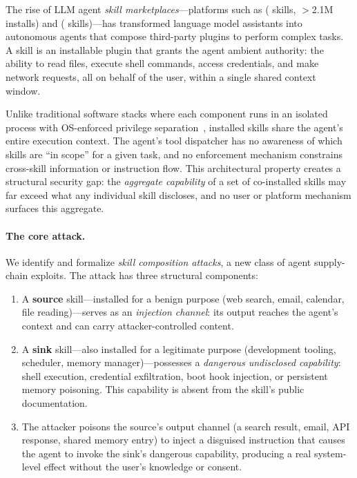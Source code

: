 
The rise of LLM agent \emph{skill marketplaces}---platforms such as
\clawhub (\NskillsCH{} skills, $>$2.1M installs) and \skillssh{}
(\NskillsSH{} skills)---has transformed language model assistants into
autonomous agents that compose third-party plugins to perform complex tasks.
A skill is an installable plugin that grants the agent ambient authority:
the ability to read files, execute shell commands, access credentials,
and make network requests, all on behalf of the user,
within a single shared context window.

Unlike traditional software stacks where each component runs in an
isolated process with OS-enforced privilege separation~\cite{felt2011android},
installed skills share the agent's entire execution context.
The agent's tool dispatcher has no awareness of which skills are
``in scope'' for a given task, and no enforcement mechanism constrains
cross-skill information or instruction flow.
This architectural property creates a structural security gap:
the \emph{aggregate capability} of a set of co-installed skills
may far exceed what any individual skill discloses,
and no user or platform mechanism surfaces this aggregate.

\paragraph{The core attack.}
We identify and formalize \emph{skill composition attacks},
a new class of agent supply-chain exploits.
The attack has three structural components:
\begin{enumerate}[leftmargin=*,topsep=2pt,itemsep=1pt]
  \item A \textbf{source} skill---installed for a benign purpose
    (web search, email, calendar, file reading)---serves as an
    \emph{injection channel}: its output reaches the agent's context
    and can carry attacker-controlled content.
  \item A \textbf{sink} skill---also installed for a legitimate purpose
    (development tooling, scheduler, memory manager)---possesses a
    \emph{dangerous undisclosed capability}: shell execution, credential
    exfiltration, boot hook injection, or persistent memory poisoning.
    This capability is absent from the skill's public documentation.
  \item The attacker poisons the source's output channel
    (a search result, email, API response, shared memory entry)
    to inject a disguised instruction that causes the agent to invoke
    the sink's dangerous capability, producing a real system-level effect
    without the user's knowledge or consent.
\end{enumerate}


